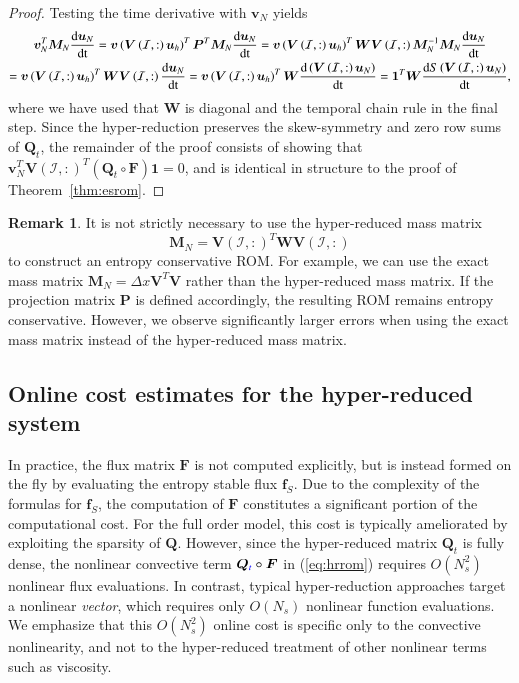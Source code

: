 \documentclass[preprint,10pt]{elsarticle}
\theoremstyle{definition}
\theoremstyle{lemma}
\newtheorem*{remark}{Remark}
\theoremstyle{theorem}
\theoremstyle{assumption}
\newcommand{\td}[2]{\frac{{\rm d}#1}{{\rm d}{\rm #2}}}
\newcommand{\LRp}[1]{\left( #1 \right)}
\newcommand{\bnote}[1]{{\color{blue}{#1}}}
\begin{document}
\begin{proof}
Testing the time derivative with $\bm{v}_N$ yields
\begin{gather*}
\bm{v}_N^T\bm{M}_N\td{\bm{u}_N}{t} = \bm{v}\LRp{\bm{V}\LRp{\mathcal{I},:}\bm{u}_h}^T\bm{P}^T\bm{M}_N\td{\bm{u}_N}{t} = \bm{v}\LRp{\bm{V}\LRp{\mathcal{I},:}\bm{u}_h}^T \bm{W}\bm{V}\LRp{\mathcal{I},:}\bm{M}_N^{-1}\bm{M}_N\td{\bm{u}_N}{t}
\\
= \bm{v}\LRp{\bm{V}\LRp{\mathcal{I},:}\bm{u}_h}^T \bm{W} \bm{V}\LRp{\mathcal{I},:}\td{\bm{u}_N}{t} = \bm{v}\LRp{\bm{V}\LRp{\mathcal{I},:}\bm{u}_h}^T \bm{W} \td{\LRp{\bm{V}\LRp{\mathcal{I},:}\bm{u}_N}}{t} = \bm{1}^T\bm{W}\td{S\LRp{\bm{V}\LRp{\mathcal{I},:}\bm{u}_N}}{t},
\end{gather*}
where we have used that $\bm{W}$ is diagonal and the temporal chain rule in the final step.  
Since the hyper-reduction preserves the skew-symmetry and zero row sums of $\bm{Q}_t$, the remainder of the proof consists of showing that $\bm{v}_N^T\bm{V}\LRp{\mathcal{I},:}^T\LRp{\bm{Q}_t \circ \bm{F}}\bm{1} = 0$, and is identical in structure to the proof of Theorem~\ref{thm:esrom}.  
\end{proof}

\begin{remark}
It is not strictly necessary to use the hyper-reduced mass matrix 
\[
\bm{M}_N = \bm{V}\LRp{\mathcal{I},:}^T\bm{W}\bm{V}\LRp{\mathcal{I},:}
\]
 to construct an entropy conservative ROM.  For example, we can use the exact mass matrix $\bm{M}_N = \Delta x \bm{V}^T\bm{V}$ rather than the hyper-reduced mass matrix.  If the projection matrix $\bm{P}$ is defined accordingly, the resulting ROM remains entropy conservative.  However, we observe significantly larger errors when using the exact mass matrix instead of the hyper-reduced mass matrix.  
\end{remark}

\subsection{Online cost estimates for the hyper-reduced system}
\label{sec:cost}
In practice, the flux matrix $\bm{F}$ is not computed explicitly, but is instead formed on the fly by evaluating the entropy stable flux $\bm{f}_S$.  Due to the complexity of the formulas for $\bm{f}_S$, the computation of $\bm{F}$ constitutes a significant portion of the computational cost.  For the full order model, this cost is typically ameliorated by exploiting the sparsity of $\bm{Q}$.  However, since the hyper-reduced matrix $\bm{Q}_t$ is fully dense, the nonlinear convective term $\bm{Q}_{\bnote{t}}\circ\bm{F}$ in (\ref{eq:hrrom}) requires $O(N_s^2)$ nonlinear flux evaluations.  In contrast, typical hyper-reduction approaches target a nonlinear \textit{vector}, which requires only $O(N_s)$ nonlinear function evaluations.  We emphasize that this $O(N_s^2)$ online cost is specific only to the convective nonlinearity, and not to the hyper-reduced treatment of other nonlinear terms such as viscosity.
\end{document}
